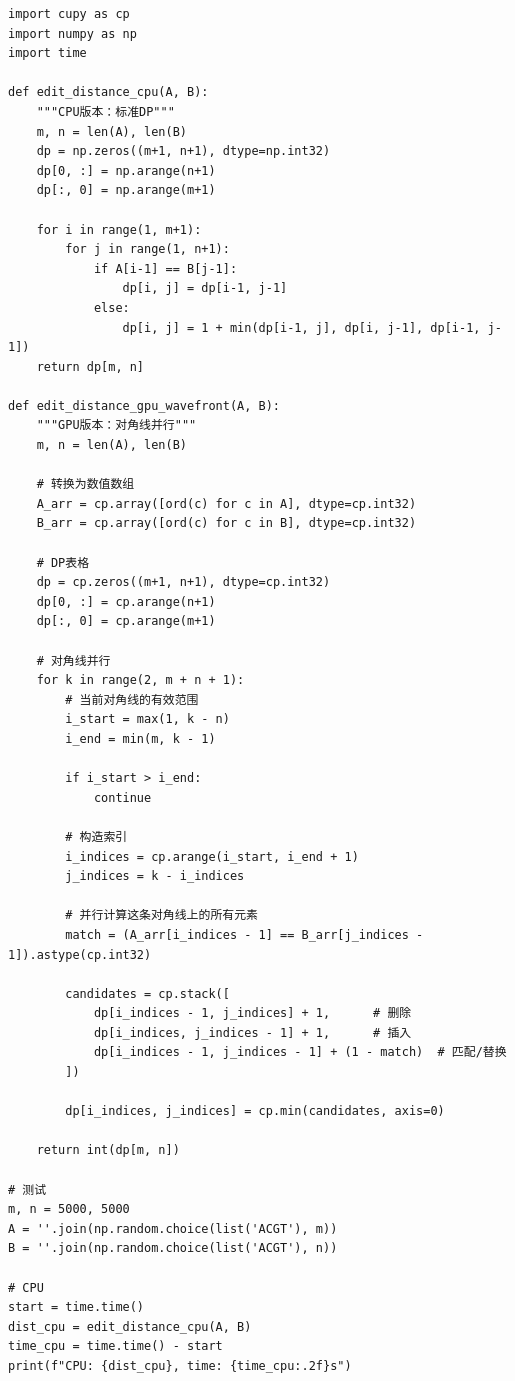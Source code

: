 \documentclass[12pt, a4paper]{ctexart}
\begin{document}
\begin{experiment}
\begin{lstlisting}
import cupy as cp
import numpy as np
import time

def edit_distance_cpu(A, B):
    """CPU版本：标准DP"""
    m, n = len(A), len(B)
    dp = np.zeros((m+1, n+1), dtype=np.int32)
    dp[0, :] = np.arange(n+1)
    dp[:, 0] = np.arange(m+1)
    
    for i in range(1, m+1):
        for j in range(1, n+1):
            if A[i-1] == B[j-1]:
                dp[i, j] = dp[i-1, j-1]
            else:
                dp[i, j] = 1 + min(dp[i-1, j], dp[i, j-1], dp[i-1, j-1])
    return dp[m, n]

def edit_distance_gpu_wavefront(A, B):
    """GPU版本：对角线并行"""
    m, n = len(A), len(B)
    
    # 转换为数值数组
    A_arr = cp.array([ord(c) for c in A], dtype=cp.int32)
    B_arr = cp.array([ord(c) for c in B], dtype=cp.int32)
    
    # DP表格
    dp = cp.zeros((m+1, n+1), dtype=cp.int32)
    dp[0, :] = cp.arange(n+1)
    dp[:, 0] = cp.arange(m+1)
    
    # 对角线并行
    for k in range(2, m + n + 1):
        # 当前对角线的有效范围
        i_start = max(1, k - n)
        i_end = min(m, k - 1)
        
        if i_start > i_end:
            continue
            
        # 构造索引
        i_indices = cp.arange(i_start, i_end + 1)
        j_indices = k - i_indices
        
        # 并行计算这条对角线上的所有元素
        match = (A_arr[i_indices - 1] == B_arr[j_indices - 1]).astype(cp.int32)
        
        candidates = cp.stack([
            dp[i_indices - 1, j_indices] + 1,      # 删除
            dp[i_indices, j_indices - 1] + 1,      # 插入
            dp[i_indices - 1, j_indices - 1] + (1 - match)  # 匹配/替换
        ])
        
        dp[i_indices, j_indices] = cp.min(candidates, axis=0)
    
    return int(dp[m, n])

# 测试
m, n = 5000, 5000
A = ''.join(np.random.choice(list('ACGT'), m))
B = ''.join(np.random.choice(list('ACGT'), n))

# CPU
start = time.time()
dist_cpu = edit_distance_cpu(A, B)
time_cpu = time.time() - start
print(f"CPU: {dist_cpu}, time: {time_cpu:.2f}s")


\end{lstlisting}
\end{experiment}
\end{document}
